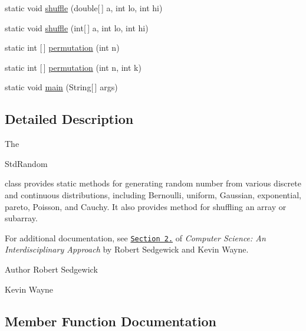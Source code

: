 \begin{DoxyCompactItemize}
\item 
static void \hyperlink{classcom_1_1mycompany_1_1myfirstmapboxapp_1_1_std_random_ac2cfaa0badeb9937111803eb2161c36d}{shuffle} (double\mbox{[}$\,$\mbox{]} a, int lo, int hi)
\item 
static void \hyperlink{classcom_1_1mycompany_1_1myfirstmapboxapp_1_1_std_random_ad66d1a9dcf82b8fcbbc4e38d5a5ac9cc}{shuffle} (int\mbox{[}$\,$\mbox{]} a, int lo, int hi)
\item 
static int \mbox{[}$\,$\mbox{]} \hyperlink{classcom_1_1mycompany_1_1myfirstmapboxapp_1_1_std_random_af712bf6c6b5da54e928785ba3a4ccf91}{permutation} (int n)
\item 
static int \mbox{[}$\,$\mbox{]} \hyperlink{classcom_1_1mycompany_1_1myfirstmapboxapp_1_1_std_random_ab7142e0b7a6d10ad398fd45906eae081}{permutation} (int n, int k)
\item 
static void \hyperlink{classcom_1_1mycompany_1_1myfirstmapboxapp_1_1_std_random_ae1ba44b2ceec04b9193e56bb40ef8411}{main} (String\mbox{[}$\,$\mbox{]} args)
\end{DoxyCompactItemize}


\subsection{Detailed Description}
The
\begin{DoxyCode}
StdRandom 
\end{DoxyCode}
 class provides static methods for generating random number from various discrete and continuous distributions, including Bernoulli, uniform, Gaussian, exponential, pareto, Poisson, and Cauchy. It also provides method for shuffling an array or subarray. 

For additional documentation, see \href{http://introcs.cs.princeton.edu/22library}{\tt Section 2.} of {\itshape Computer Science\+: An Interdisciplinary Approach} by Robert Sedgewick and Kevin Wayne.

\begin{DoxyAuthor}{Author}
Robert Sedgewick 

Kevin Wayne 
\end{DoxyAuthor}


\subsection{Member Function Documentation}
\mbox{\label{classcom_1_1mycompany_1_1myfirstmapboxapp_1_1_std_random_a34585a3fcc8fc048d638201c84db1848}} 
